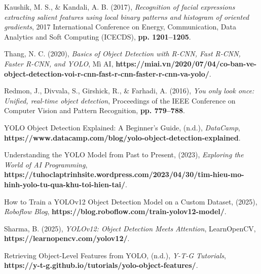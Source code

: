 \documentclass[a4paper,13pt]{report}
\begin{document}
\begin{thebibliography}{9}
 Kaushik, M. S., \& Kandali, A. B. (2017), \textit{Recognition of facial expressions extracting salient features using local binary patterns and histogram of oriented gradients}, 2017 International Conference on Energy, Communication, Data Analytics and Soft Computing (ICECDS), \textbf{pp. 1201--1205}.

Thang, N. C. (2020), \textit{Basics of Object Detection with R-CNN, Fast R-CNN, Faster R-CNN, and YOLO}, Mì AI, \textbf{https://miai.vn/2020/07/04/co-ban-ve-object-detection-voi-r-cnn-fast-r-cnn-faster-r-cnn-va-yolo/}.

 Redmon, J., Divvala, S., Girshick, R., \& Farhadi, A. (2016), \textit{You only look once: Unified, real-time object detection}, Proceedings of the IEEE Conference on Computer Vision and Pattern Recognition, \textbf{pp. 779--788}.

 YOLO Object Detection Explained: A Beginner’s Guide, (n.d.), \textit{DataCamp}, \textbf{https://www.datacamp.com/blog/yolo-object-detection-explained}.

 Understanding the YOLO Model from Past to Present, (2023), \textit{Exploring the World of AI Programming}, \textbf{https://tuhoclaptrinhsite.wordpress.com/2023/04/30/tim-hieu-mo-hinh-yolo-tu-qua-khu-toi-hien-tai/}.

 How to Train a YOLOv12 Object Detection Model on a Custom Dataset, (2025), \textit{Roboflow Blog}, \textbf{https://blog.roboflow.com/train-yolov12-model/}.

 Sharma, B. (2025), \textit{YOLOv12: Object Detection Meets Attention}, LearnOpenCV, \textbf{https://learnopencv.com/yolov12/}.

 Retrieving Object-Level Features from YOLO, (n.d.), \textit{Y-T-G Tutorials}, \textbf{https://y-t-g.github.io/tutorials/yolo-object-features/}.


\end{thebibliography}
\end{document}
